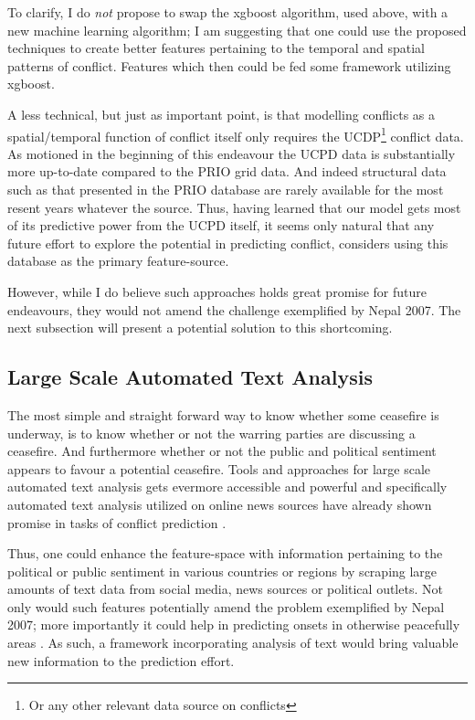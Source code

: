 \documentclass[a4paper]{article}
\begin{document}
To clarify, I do \emph{not} propose to swap the xgboost algorithm, used above, with a new machine learning algorithm; I am suggesting that one could use the proposed techniques to create better features pertaining to the temporal and spatial patterns of conflict. Features which then could be fed some framework utilizing xgboost.\par

A less technical, but just as important point, is that modelling conflicts as a spatial/temporal function of conflict itself only requires the UCDP\footnote{Or any other relevant data source on conflicts} conflict data. As motioned in the beginning of this endeavour the UCPD data is substantially more up-to-date compared to the PRIO grid data. And indeed structural data such as that presented in the PRIO database are rarely available for the most resent years whatever the source. Thus, having learned that our model gets most of its predictive power from the UCPD itself, it seems only natural that any future effort to explore the potential in predicting conflict, considers using this database as the primary feature-source.\par

However, while I do believe such approaches holds great promise for future endeavours, they would not amend the challenge exemplified by Nepal 2007. The next subsection will present a potential solution to this shortcoming.\par

\subsection{Large Scale Automated Text Analysis}

The most simple and straight forward way to know whether some ceasefire is underway, is to know whether or not the warring parties are discussing a ceasefire. And furthermore whether or not the public and political sentiment appears to favour a potential ceasefire. Tools and approaches for large scale automated text analysis gets evermore accessible and powerful and specifically automated text analysis utilized on online news sources have already shown promise in tasks of conflict prediction \citep{chadefaux_2014, mueller_2016}. 

Thus, one could enhance the feature-space with information pertaining to the political or public sentiment in various countries or regions by scraping large amounts of text data from social media, news sources or political outlets. Not only would such features potentially amend the problem exemplified by Nepal 2007; more importantly it could help in predicting onsets in otherwise peacefully areas \cite{mueller_2016}. As such, a framework incorporating analysis of text would bring valuable new information to the prediction effort.\par
\end{document}
